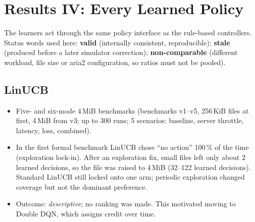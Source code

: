 \chapter{Results IV: Every Learned Policy}\label{ch:learned}
The learners act through the same policy interface as the rule-based controllers. Status words used here: \textbf{valid} (internally consistent, reproducible); \textbf{stale} (produced before a later simulator correction); \textbf{non-comparable} (different workload, file size or aria2 configuration, so ratios must not be pooled).

\section{LinUCB}
\begin{itemize}
\item Five- and six-mode 4\,MiB benchmarks (benchmarks v1--v5, 256\,KiB files at first, 4\,MiB from v3; up to 300 runs; 5 scenarios: baseline, server throttle, latency, loss, combined).
\item In the first formal benchmark LinUCB chose ``no action'' 100\,\% of the time (exploration lock-in). After an exploration fix, small files left only about 2 learned decisions, so the file was raised to 4\,MiB (32--122 learned decisions). Standard LinUCB still locked onto one arm; periodic exploration changed coverage but not the dominant preference.
\item Outcome: \emph{descriptive}; no ranking was made. This motivated moving to Double DQN, which assigns credit over time.
\end{itemize}

